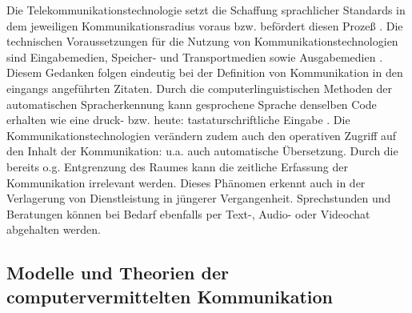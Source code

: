 \begin{sloppypar}
Die Telekommunikationstechnologie setzt die \glqq Schaffung sprachlicher Standards in dem jeweiligen Kommunikationsradius voraus bzw. befördert diesen Prozeß\grqq{} \citep[1143]{brinker_voraussetzungen_2001}. Die technischen Voraussetzungen für die Nutzung von Kommunikationstechnologien sind \glqq Eingabemedien, Speicher- und Transportmedien sowie Ausgabemedien\grqq{} \citep[1144]{brinker_voraussetzungen_2001}. Diesem Gedanken folgen eindeutig \citeauthor{trepte_medienpsychologie_2012} bei der Definition von Kommunikation in den eingangs angeführten Zitaten. \glqq Durch die computerlinguistischen Methoden der automatischen Spracherkennung kann gesprochene Sprache denselben Code erhalten wie eine druck- bzw. heute: tastaturschriftliche Eingabe\grqq{} \citep[1145]{brinker_voraussetzungen_2001}. Die Kommunikationstechnologien verändern zudem auch den operativen Zugriff auf den Inhalt der Kommunikation: u.a. auch automatische Übersetzung. Durch die bereits o.g. Entgrenzung des Raumes kann die zeitliche Erfassung der Kommunikation irrelevant werden. Dieses Phänomen erkennt \citet[127]{beck_computervermittelte_2006} auch in der Verlagerung von Dienstleistung in jüngerer Vergangenheit. Sprechstunden und Beratungen können bei Bedarf ebenfalls per Text-, Audio- oder Videochat abgehalten werden. 
\end{sloppypar}


%

\subsection{Modelle und Theorien der computervermittelten Kommunikation}
\label{K2:subsec:modelle-theorien-cvk}


